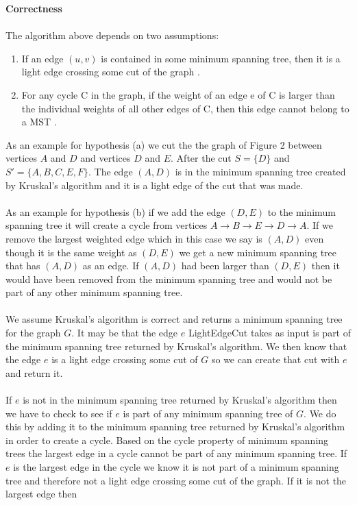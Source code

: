 \documentclass[12pt]{article}
\begin{document}
\begin{enumerate}
	\textbf{Correctness}\\
	\\
	The algorithm above depends on two assumptions:
	\begin{enumerate}
		\item If an edge $(u, v)$ is contained in some minimum spanning tree, then it is a light edge crossing some cut of the graph \cite{2}.
		\item For any cycle C in the graph, if the weight of an edge e of C is larger than the individual weights of all other edges of C, then this edge cannot belong to a MST \cite{3}.
	\end{enumerate}
	As an example for hypothesis (a) we cut the the graph of Figure 2 between vertices $A$ and $D$ and vertices $D$ and $E$.  After the cut $S = \{D\}$ and $S'=\{A,B,C,E,F\}$.
	The edge $(A,D)$ is in the minimum spanning tree created by Kruskal's algorithm and it is a light edge of the cut that was made.\\
	\\
	As an example for hypothesis (b) if we add the edge $(D,E)$ to the minimum spanning tree it will create a cycle from vertices $A \rightarrow B \rightarrow E \rightarrow D \rightarrow A$.
	If we remove the largest weighted edge which in this case we say is $(A,D)$ even though it is the same weight as $(D,E)$ we get a new minimum spanning tree that has $(A,D)$ as an edge.  
	If $(A,D)$ had been larger than $(D,E)$ then it would have been removed from the minimum spanning tree and would not be part of any other minimum spanning tree.\\
	\\ 
	We assume Kruskal's algorithm is correct and returns a minimum spanning tree for the graph $G$.  
	It may be that the edge $e$ LightEdgeCut takes as input is part of the minimum spanning tree returned by Kruskal's algorithm.  
	We then know that the edge $e$ is a light edge crossing some cut of $G$ so we can create that cut with $e$ and return it. \\
	\\ 
	If $e$ is not in the minimum spanning tree returned by Kruskal's algorithm then we have to check to see if $e$ is part of any minimum spanning tree of $G$.
	We do this by adding it to the minimum spanning tree returned by Kruskal's algorithm in order to create a cycle.  
	Based on the cycle property of minimum spanning trees the largest edge in a cycle cannot be part of any minimum spanning tree.  If $e$ is the largest edge
	in the cycle we know it is not part of a minimum spanning tree and therefore not a light edge crossing some cut of the graph.  If it is not the largest edge then

\end{enumerate}
\end{document}

